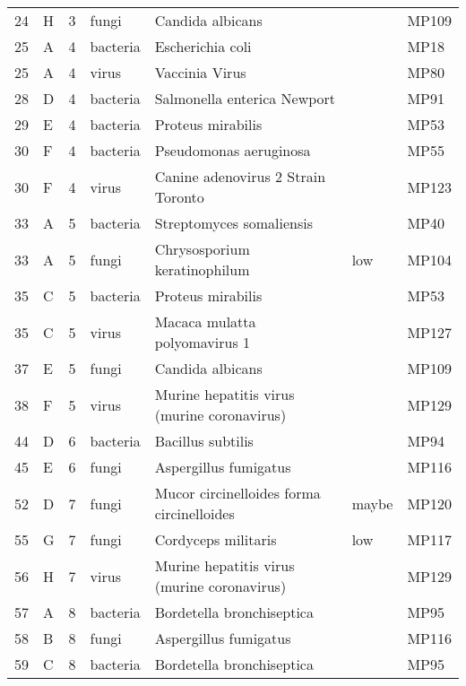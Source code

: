 \documentclass{article}
\begin{document}
\begin{table}
\begin{tabular}{rlrllll}
24 & H & 3 & fungi & Candida albicans &  & MP109\\
25 & A & 4 & bacteria & Escherichia coli &  & MP18\\
25 & A & 4 & virus & Vaccinia Virus &  & MP80\\
28 & D & 4 & bacteria & Salmonella enterica Newport &  & MP91\\
29 & E & 4 & bacteria & Proteus mirabilis &  & MP53\\
30 & F & 4 & bacteria & Pseudomonas aeruginosa &  & MP55\\
30 & F & 4 & virus & Canine adenovirus 2 Strain Toronto &  & MP123\\
33 & A & 5 & bacteria & Streptomyces somaliensis &  & MP40\\
33 & A & 5 & fungi & Chrysosporium keratinophilum & low & MP104\\
35 & C & 5 & bacteria & Proteus mirabilis &  & MP53\\
35 & C & 5 & virus & Macaca mulatta polyomavirus 1 &  & MP127\\
37 & E & 5 & fungi & Candida albicans &  & MP109\\
38 & F & 5 & virus & Murine hepatitis virus (murine coronavirus) &  & MP129\\
44 & D & 6 & bacteria & Bacillus subtilis &  & MP94\\
45 & E & 6 & fungi & Aspergillus fumigatus &  & MP116\\
52 & D & 7 & fungi & Mucor circinelloides forma circinelloides & maybe & MP120\\
55 & G & 7 & fungi & Cordyceps militaris & low & MP117\\
56 & H & 7 & virus & Murine hepatitis virus (murine coronavirus) &  & MP129\\
57 & A & 8 & bacteria & Bordetella bronchiseptica &  & MP95\\
58 & B & 8 & fungi & Aspergillus fumigatus &  & MP116\\
59 & C & 8 & bacteria & Bordetella bronchiseptica &  & MP95\\
\end{tabular}
\end{table}
\end{document}
